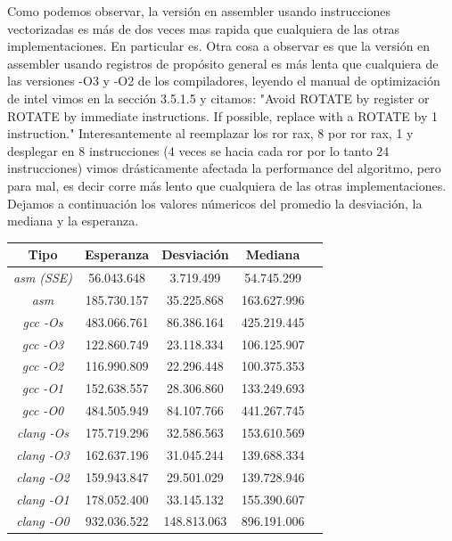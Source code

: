 \documentclass[a4paper]{article}
\begin{document}
Como podemos observar, la versión en assembler usando instrucciones vectorizadas es más de dos veces mas rapida que cualquiera de las otras implementaciones. En particular es. Otra cosa a observar es que la versión en assembler usando registros de propósito general es más lenta que cualquiera de las versiones -O3 y -O2 de los compiladores, leyendo el manual de optimización de intel vimos en la sección 3.5.1.5 y citamos: "Avoid ROTATE by register or ROTATE by immediate instructions. If possible, replace with a ROTATE by 1 instruction."
Interesantemente al reemplazar los ror rax, 8 por ror rax, 1 y desplegar en 8 instrucciones (4 veces se hacia cada ror por lo tanto 24 instrucciones) vimos drásticamente afectada la performance del algoritmo, pero para mal, es decir corre más lento que cualquiera de las otras implementaciones. Dejamos a continuación los valores númericos del promedio la desviación, la mediana y la esperanza.


\begin{center}
        \begin{tabular}[c]{|c|c|c|c|c|}
    \hline
        \textbf{Tipo} &  \textbf{Esperanza} & \textbf{Desviación} & \textbf{Mediana}\\
        \hline
\textit{asm (SSE)} &  56.043.648  & 3.719.499 & 54.745.299\\
        \hline
\textit{asm} &   185.730.157    & 35.225.868 & 163.627.996 \\
		\hline
\textit{gcc -Os} &  483.066.761   & 86.386.164 & 425.219.445\\
        \hline
\textit{gcc -O3} &  122.860.749 & 23.118.334 & 106.125.907\\
        \hline
\textit{gcc -O2} &  116.990.809 & 22.296.448 & 100.375.353\\
        \hline
\textit{gcc -O1} & 152.638.557 & 28.306.860 & 133.249.693\\
        \hline
\textit{gcc -O0} & 484.505.949  & 84.107.766 & 441.267.745\\
        \hline
\textit{clang -Os} &  175.719.296 & 32.586.563 & 153.610.569\\
        \hline
\textit{clang -O3} &   162.637.196 & 31.045.244 & 139.688.334\\
        \hline
\textit{clang -O2} &    159.943.847 & 29.501.029 & 139.728.946\\
        \hline
\textit{clang -O1} &    178.052.400  & 33.145.132 & 155.390.607\\
        \hline
\textit{clang -O0} & 932.036.522  & 148.813.063 & 896.191.006 \\
        \hline
    \end{tabular}
\end{center}
\end{document}
